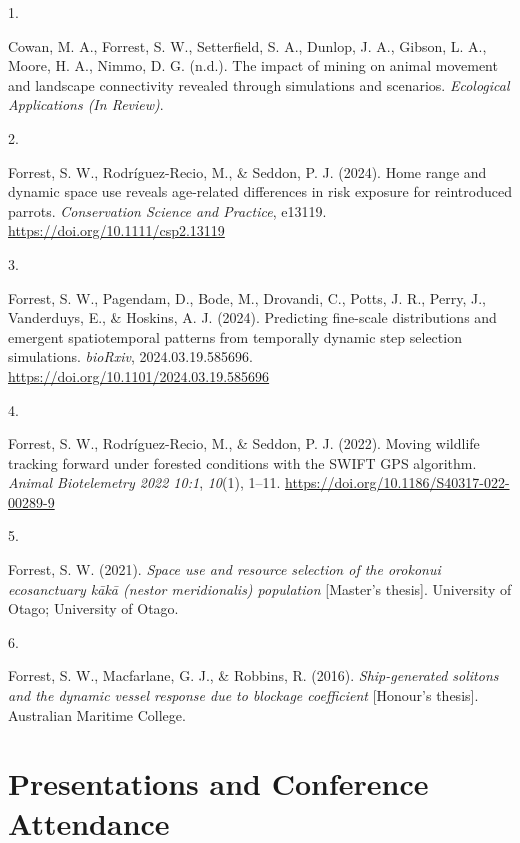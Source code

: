 \documentclass[11pt,a4paper,]{awesome-cv}
\newlength{\cslhangindent}
\newlength{\csllabelwidth}
\newenvironment{CSLReferences}[2] %
 {\begin{list}{}{%
  \setlength{\itemindent}{0pt}
  \setlength{\leftmargin}{0pt}
  \setlength{\parsep}{0pt}
  \ifodd #1
   \setlength{\leftmargin}{\cslhangindent}
   \setlength{\itemindent}{-1\cslhangindent}
  \fi
  \setlength{\itemsep}{#2\baselineskip}}}
 {\end{list}}
\newcommand{\CSLLeftMargin}[1]{\parbox[t]{\csllabelwidth}{\strut#1\strut}}
\newcommand{\CSLRightInline}[1]{\parbox[t]{\linewidth - \csllabelwidth}{\strut#1\strut}}
\begin{document}
\label{refs-3e3d6a4d527f4154aec269012946414f}
\begin{CSLReferences}{0}{0}
\CSLLeftMargin{1. }%
\CSLRightInline{Cowan, M. A., Forrest, S. W., Setterfield, S. A.,
Dunlop, J. A., Gibson, L. A., Moore, H. A., Nimmo, D. G. (n.d.). The
impact of mining on animal movement and landscape connectivity revealed
through simulations and scenarios. \emph{Ecological Applications (In
Review)}.}

\CSLLeftMargin{2. }%
\CSLRightInline{Forrest, S. W., Rodríguez-Recio, M., \& Seddon, P. J.
(2024). Home range and dynamic space use reveals age-related differences
in risk exposure for reintroduced parrots. \emph{Conservation Science
and Practice}, e13119. \url{https://doi.org/10.1111/csp2.13119}}

\CSLLeftMargin{3. }%
\CSLRightInline{Forrest, S. W., Pagendam, D., Bode, M., Drovandi, C.,
Potts, J. R., Perry, J., Vanderduys, E., \& Hoskins, A. J. (2024).
Predicting fine-scale distributions and emergent spatiotemporal patterns
from temporally dynamic step selection simulations. \emph{bioRxiv},
2024.03.19.585696. \url{https://doi.org/10.1101/2024.03.19.585696}}

\CSLLeftMargin{4. }%
\CSLRightInline{Forrest, S. W., Rodríguez-Recio, M., \& Seddon, P. J.
(2022). Moving wildlife tracking forward under forested conditions with
the SWIFT GPS algorithm. \emph{Animal Biotelemetry 2022 10:1},
\emph{10}(1), 1--11. \url{https://doi.org/10.1186/S40317-022-00289-9}}

\CSLLeftMargin{5. }%
\CSLRightInline{Forrest, S. W. (2021). \emph{Space use and resource
selection of the orokonui ecosanctuary kākā (nestor meridionalis)
population} {[}Master's thesis{]}. University of Otago; University of
Otago.}

\CSLLeftMargin{6. }%
\CSLRightInline{Forrest, S. W., Macfarlane, G. J., \& Robbins, R.
(2016). \emph{Ship-generated solitons and the dynamic vessel response
due to blockage coefficient} {[}Honour's thesis{]}. Australian Maritime
College.}

\end{CSLReferences}

\section{Presentations and Conference
Attendance}\label{presentations-and-conference-attendance}
\end{document}
